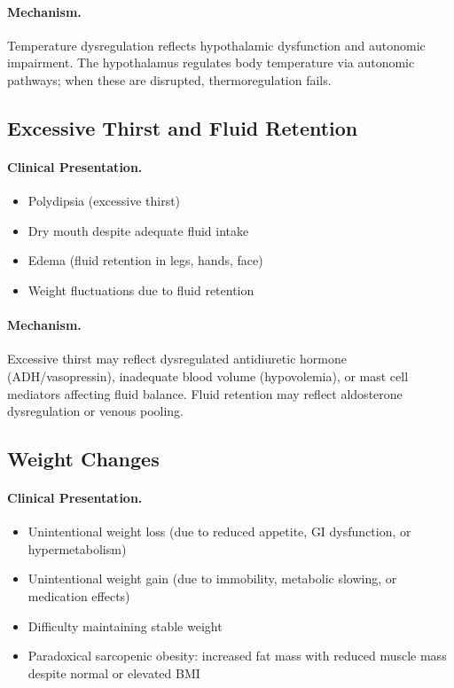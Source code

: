 \paragraph{Mechanism.}
Temperature dysregulation reflects hypothalamic dysfunction and autonomic impairment. The hypothalamus regulates body temperature via autonomic pathways; when these are disrupted, thermoregulation fails.

\subsection{Excessive Thirst and Fluid Retention}
\label{subsec:thirst}

\paragraph{Clinical Presentation.}
\begin{itemize}
    \item Polydipsia (excessive thirst)
    \item Dry mouth despite adequate fluid intake
    \item Edema (fluid retention in legs, hands, face)
    \item Weight fluctuations due to fluid retention
\end{itemize}

\paragraph{Mechanism.}
Excessive thirst may reflect dysregulated antidiuretic hormone (ADH/vasopressin), inadequate blood volume (hypovolemia), or mast cell mediators affecting fluid balance. Fluid retention may reflect aldosterone dysregulation or venous pooling.

\subsection{Weight Changes}
\label{subsec:weight-changes}

\paragraph{Clinical Presentation.}
\begin{itemize}
    \item Unintentional weight loss (due to reduced appetite, GI dysfunction, or hypermetabolism)
    \item Unintentional weight gain (due to immobility, metabolic slowing, or medication effects)
    \item Difficulty maintaining stable weight
    \item Paradoxical sarcopenic obesity: increased fat mass with reduced muscle mass despite normal or elevated BMI
\end{itemize}

